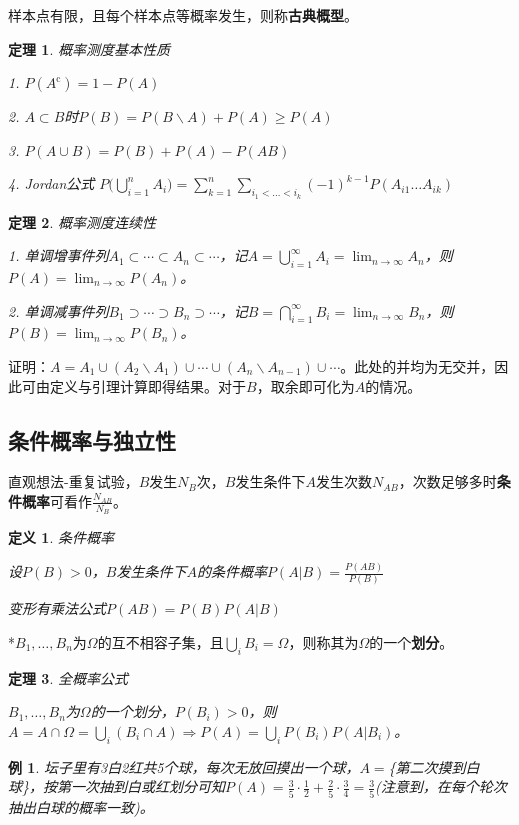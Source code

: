 \documentclass[a4paper,UTF8,fontset=windows]{ctexart}
\newtheorem{thm}{定理}[section]
\newtheorem{exmp}{例}[section]
\newtheorem{defi}{定义}[section]
\begin{document}
样本点有限，且每个样本点等概率发生，则称\textbf{古典概型}。

\begin{thm}
概率测度基本性质

1. $P(A^\mathrm{c})=1-P(A)$

2. $A\subset B$时$P(B)=P(B\backslash A)+P(A)\ge P(A)$

3. $P(A\cup B)=P(B)+P(A)-P(AB)$

4. Jordan公式 $P\bigg(\bigcup_{i=1}^nA_i\bigg)=\sum_{k=1}^n\sum_{i_1<\dots<i_k}(-1)^{k-1}P(A_{i1}\dots A_{ik})$
\end{thm}

\begin{thm} 概率测度连续性
	
1. 单调增事件列$A_1\subset\cdots\subset A_n\subset\cdots$，记$A=\bigcup_{i=1}^{\infty}A_i=\lim_{n\to\infty}A_n$，则$P(A)=\lim_{n\to\infty}P(A_n)$。

2. 单调减事件列$B_1\supset\cdots\supset B_n\supset\cdots$，记$B=\bigcap_{i=1}^{\infty}B_i=\lim_{n\to\infty}B_n$，则$P(B)=\lim_{n\to\infty}P(B_n)$。
\end{thm}

证明：$A=A_1\cup(A_2\backslash A_1)\cup\cdots\cup(A_n\backslash A_{n-1})\cup\cdots$。此处的并均为无交并，因此可由定义与引理计算即得结果。对于$B$，取余即可化为$A$的情况。

\subsection{条件概率与独立性}
直观想法-重复试验，$B$发生$N_B$次，$B$发生条件下$A$发生次数$N_{AB}$，次数足够多时\textbf{条件概率}可看作$\frac{N_{AB}}{N_B}$。

\begin{defi} 条件概率

设$P(B)>0$，$B$发生条件下$A$的条件概率$P(A|B)=\frac{P(AB)}{P(B)}$

变形有乘法公式$P(AB)=P(B)P(A|B)$
\end{defi}

*$B_1,\dots,B_n$为$\Omega$的互不相容子集，且$\bigcup_iB_i=\Omega$，则称其为$\Omega$的一个\textbf{划分}。

\begin{thm} 全概率公式

$B_1,\dots,B_n$为$\Omega$的一个划分，$P(B_i)>0$，则$A=A\cap\Omega=\bigcup_i(B_i\cap A)\Rightarrow P(A)=\bigcup_iP(B_i)P(A|B_i)$。
\end{thm}

\begin{exmp}
坛子里有3白2红共5个球，每次无放回摸出一个球，$A=$\{第二次摸到白球\}，按第一次抽到白或红划分可知$P(A)=\frac{3}{5}\cdot\frac{1}{2}+\frac{2}{5}\cdot\frac{3}{4}=\frac{3}{5}$(注意到，在每个轮次抽出白球的概率一致)。
\end{exmp}
\end{document}
